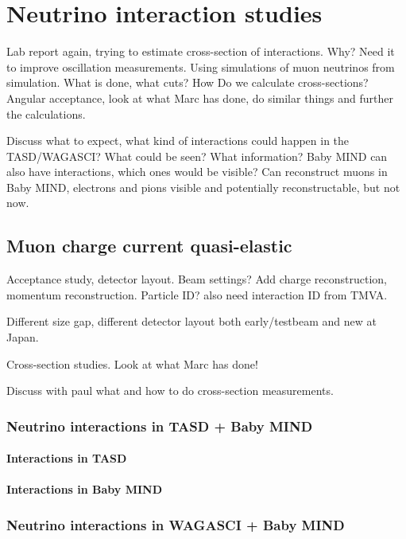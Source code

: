 \chapter{Neutrino interaction studies}
\label{c:neutrino}

Lab report again, trying to estimate cross-section of interactions. Why? Need it to improve oscillation measurements. Using simulations of muon neutrinos from simulation. What is done, what cuts? How Do we calculate cross-sections? Angular acceptance, look at what Marc has done, do similar things and further the calculations.

Discuss what to expect, what kind of interactions could happen in the TASD/WAGASCI? What could be seen? What information? Baby MIND can also have interactions, which ones would be visible? Can reconstruct muons in Baby MIND, electrons and pions visible and potentially reconstructable, but not now.

\section{Muon charge current quasi-elastic}

Acceptance study, detector layout. Beam settings? Add charge reconstruction, momentum reconstruction. Particle ID? also need interaction ID from TMVA.

Different size gap, different detector layout both early/testbeam and new at Japan.


Cross-section studies. Look at what Marc has done! 

Discuss with paul what and how to do cross-section measurements.

\subsection{Neutrino interactions in TASD + Baby MIND}

\subsubsection{Interactions in TASD}

\subsubsection{Interactions in Baby MIND}

\subsection{Neutrino interactions in WAGASCI + Baby MIND}

